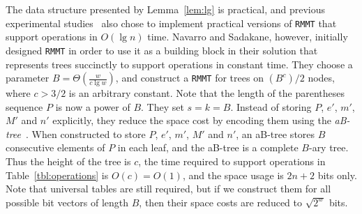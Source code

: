 The data structure presented by Lemma~\ref{lem:lg} is practical, and previous experimental studies~\cite{ACNSalenex10} also chose to implement practical versions of {\tt RMMT} that support operations in $O(\lg n)$ time. 
Navarro and Sadakane, however, initially designed {\tt RMMT} in order to use it as a building block in their solution that represents trees succinctly to support operations in constant time. 
They choose a parameter $B = \Theta(\frac{w}{c\lg w})$, and construct a {\tt RMMT} for trees on $(B^c)/2$ nodes, where $c > 3/2$ is an arbitrary constant. 
Note that the length of the parentheses sequence $P$ is now a power of $B$. 
They set $s = k = B$. 
Instead of storing $P$, $e'$, $m'$, $M'$ and $n'$ explicitly, they reduce the space cost by encoding them using the {\em aB-tree}~\cite{Patrascu:2008:SUC:1470582.1470670}. 
When constructed to store $P$, $e'$, $m'$, $M'$ and $n'$, an aB-tree stores $B$ consecutive elements of $P$ in each leaf, and the aB-tree is a complete $B$-ary tree. 
Thus the height of the tree is $c$, the time required to support operations in Table~\ref{tbl:operations} is $O(c) = O(1)$, and the space usage is $2n+2$ bits only. 
Note that universal tables are still required, but if we construct them for all possible bit vectors of length $B$, then their space costs are reduced to $\sqrt{2^w}$ bits. 

%
%
%
%
%
